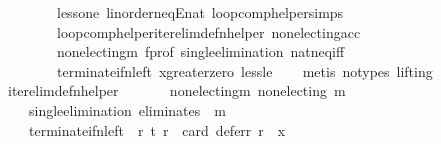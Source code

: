\begin{isabellebody}
\ \ \ \ \ \ \ \ less{\isacharunderscore}{\kern0pt}one\ linorder{\isacharunderscore}{\kern0pt}neqE{\isacharunderscore}{\kern0pt}nat\ loop{\isacharunderscore}{\kern0pt}comp{\isacharunderscore}{\kern0pt}helper{\isachardot}{\kern0pt}simps{\isacharparenleft}{\kern0pt}{}{\isacharparenright}{\kern0pt}\isanewline
\ \ \ \ \ \ \ \ loop{\isacharunderscore}{\kern0pt}comp{\isacharunderscore}{\kern0pt}helper{\isacharunderscore}{\kern0pt}iter{\isacharunderscore}{\kern0pt}elim{\isacharunderscore}{\kern0pt}def{\isacharunderscore}{\kern0pt}n{\isacharunderscore}{\kern0pt}helper\ non{\isacharunderscore}{\kern0pt}electing{\isacharunderscore}{\kern0pt}acc\isanewline
\ \ \ \ \ \ \ \ non{\isacharunderscore}{\kern0pt}electing{\isacharunderscore}{\kern0pt}m\ f{\isacharunderscore}{\kern0pt}prof\ single{\isacharunderscore}{\kern0pt}elimination\ nat{\isacharunderscore}{\kern0pt}neq{\isacharunderscore}{\kern0pt}iff\isanewline
\ \ \ \ \ \ \ \ terminate{\isacharunderscore}{\kern0pt}if{\isacharunderscore}{\kern0pt}n{\isacharunderscore}{\kern0pt}left\ x{\isacharunderscore}{\kern0pt}greater{\isacharunderscore}{\kern0pt}zero\ less{\isacharunderscore}{\kern0pt}le\isanewline
\ \ \isamarkupfalse%
\ {\isacharparenleft}{\kern0pt}metis\ {\isacharparenleft}{\kern0pt}no{\isacharunderscore}{\kern0pt}types{\isacharcomma}{\kern0pt}\ lifting{\isacharparenright}{\kern0pt}{\isacharparenright}{\kern0pt}%
\endisatagproof
{\isafoldproof}%
%
\isadelimproof
\isanewline
%
\endisadelimproof
\isanewline
{}\isamarkupfalse%
\ iter{\isacharunderscore}{\kern0pt}elim{\isacharunderscore}{\kern0pt}def{\isacharunderscore}{\kern0pt}n{\isacharunderscore}{\kern0pt}helper{\isacharcolon}{\kern0pt}\isanewline
\ \ \isanewline
\ \ \ \ non{\isacharunderscore}{\kern0pt}electing{\isacharunderscore}{\kern0pt}m{\isacharcolon}{\kern0pt}\ {\isachardoublequoteopen}non{\isacharunderscore}{\kern0pt}electing\ m{\isachardoublequoteclose}\ \isanewline
\ \ \ \ single{\isacharunderscore}{\kern0pt}elimination{\isacharcolon}{\kern0pt}\ {\isachardoublequoteopen}eliminates\ {}\ m{\isachardoublequoteclose}\ \isanewline
\ \ \ \ terminate{\isacharunderscore}{\kern0pt}if{\isacharunderscore}{\kern0pt}n{\isacharunderscore}{\kern0pt}left{\isacharcolon}{\kern0pt}\ {\isachardoublequoteopen}{\isasymforall}\ r{\isachardot}{\kern0pt}\ {\isacharparenleft}{\kern0pt}{\isacharparenleft}{\kern0pt}t\ r{\isacharparenright}{\kern0pt}\ {\isasymlongleftrightarrow}\ {\isacharparenleft}{\kern0pt}card\ {\isacharparenleft}{\kern0pt}defer{\isacharunderscore}{\kern0pt}r\ r{\isacharparenright}{\kern0pt}\ {\isacharequal}{\kern0pt}\ x{\isacharparenright}{\kern0pt}{\isacharparenright}{\kern0pt}{\isachardoublequoteclose}\ \isanewline

\end{isabellebody}
